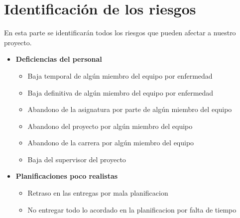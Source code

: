 \documentclass[spanish,a4paper,12pt]{report}	%
\begin{document}
\part{Identificación de los riesgos}
En esta parte se identificarán todos los riesgos que pueden afectar a nuestro proyecto.
\begin{itemize}
\item \textbf {Deficiencias del personal}
	\begin{itemize}
		\item {Baja temporal de algún miembro del equipo por enfermedad}
		\item {Baja definitiva de algún miembro del equipo por enfermedad}
		\item {Abandono de la asignatura por parte de algún miembro del equipo}
		\item {Abandono del proyecto por algún miembro del equipo}
		\item {Abandono de la carrera por algún miembro del equipo}
		\item {Baja del supervisor del proyecto}
	\end{itemize}
\item \textbf {Planificaciones poco realistas}
	\begin{itemize}
		\item {Retraso en las entregas por mala planificacion}
		\item {No entregar todo lo acordado en la planificacion por falta de tiempo}


\end{itemize}
\end{itemize}
\end{document}
